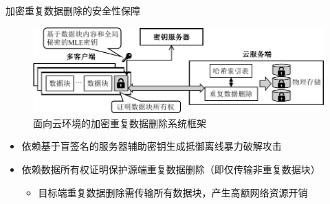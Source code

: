 \documentclass{beamer}
\begin{document}
\begin{frame}{加密重复数据删除的安全性保障}
    \begin{figure}[!htb]
        \small
        \centering
        \includegraphics[width=\textwidth]{../pic/background/Cloud-encrypted-deduplication-logic.pdf}
        \caption{面向云环境的加密重复数据删除系统框架}
        \label{fig:Cloud-based-encrypted-deduplication-storage-logic}
    \end{figure}
    \vspace{-1em}
    \begin{itemize}
        \item 依赖基于盲签名的服务器辅助密钥生成抵御离线暴力破解攻击
        \item 依赖数据所有权证明保护源端重复数据删除（即仅传输非重复数据块）
              \begin{itemize}
                  \item 目标端重复数据删除需传输所有数据块，产生高额网络资源开销
              \end{itemize}
    \end{itemize}
\end{frame}
\end{document}
